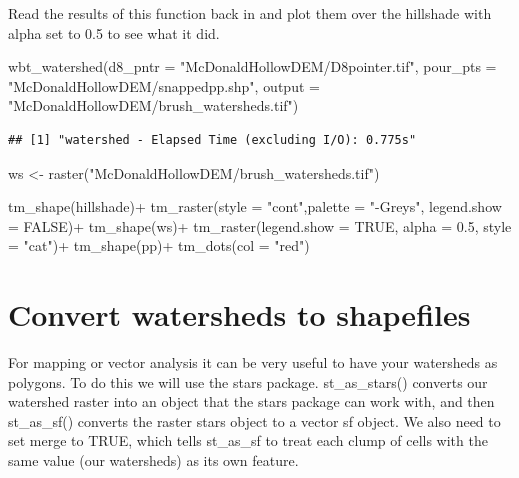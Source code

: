 \documentclass[
]{book}
\newenvironment{Shaded}{\begin{snugshade}}{\end{snugshade}}
\newcommand{\AttributeTok}[1]{\textcolor[rgb]{0.77,0.63,0.00}{#1}}
\newcommand{\ConstantTok}[1]{\textcolor[rgb]{0.00,0.00,0.00}{#1}}
\newcommand{\FloatTok}[1]{\textcolor[rgb]{0.00,0.00,0.81}{#1}}
\newcommand{\FunctionTok}[1]{\textcolor[rgb]{0.00,0.00,0.00}{#1}}
\newcommand{\NormalTok}[1]{#1}
\newcommand{\OtherTok}[1]{\textcolor[rgb]{0.56,0.35,0.01}{#1}}
\newcommand{\SpecialCharTok}[1]{\textcolor[rgb]{0.00,0.00,0.00}{#1}}
\newcommand{\StringTok}[1]{\textcolor[rgb]{0.31,0.60,0.02}{#1}}
\begin{document}
Read the results of this function back in and plot them over the hillshade with alpha set to 0.5 to see what it did.

\begin{Shaded}
\begin{Highlighting}[]
\FunctionTok{wbt\_watershed}\NormalTok{(}\AttributeTok{d8\_pntr =} \StringTok{"McDonaldHollowDEM/D8pointer.tif"}\NormalTok{,}
              \AttributeTok{pour\_pts =} \StringTok{"McDonaldHollowDEM/snappedpp.shp"}\NormalTok{,}
              \AttributeTok{output =} \StringTok{"McDonaldHollowDEM/brush\_watersheds.tif"}\NormalTok{)}
\end{Highlighting}
\end{Shaded}

\begin{verbatim}
## [1] "watershed - Elapsed Time (excluding I/O): 0.775s"
\end{verbatim}

\begin{Shaded}
\begin{Highlighting}[]
\NormalTok{ws }\OtherTok{\textless{}{-}} \FunctionTok{raster}\NormalTok{(}\StringTok{"McDonaldHollowDEM/brush\_watersheds.tif"}\NormalTok{)}

\FunctionTok{tm\_shape}\NormalTok{(hillshade)}\SpecialCharTok{+}
  \FunctionTok{tm\_raster}\NormalTok{(}\AttributeTok{style =} \StringTok{"cont"}\NormalTok{,}\AttributeTok{palette =} \StringTok{"{-}Greys"}\NormalTok{, }\AttributeTok{legend.show =} \ConstantTok{FALSE}\NormalTok{)}\SpecialCharTok{+}
\FunctionTok{tm\_shape}\NormalTok{(ws)}\SpecialCharTok{+}
  \FunctionTok{tm\_raster}\NormalTok{(}\AttributeTok{legend.show =} \ConstantTok{TRUE}\NormalTok{, }\AttributeTok{alpha =} \FloatTok{0.5}\NormalTok{, }\AttributeTok{style =} \StringTok{"cat"}\NormalTok{)}\SpecialCharTok{+}
\FunctionTok{tm\_shape}\NormalTok{(pp)}\SpecialCharTok{+}
  \FunctionTok{tm\_dots}\NormalTok{(}\AttributeTok{col =} \StringTok{"red"}\NormalTok{)}
\end{Highlighting}
\end{Shaded}

\hypertarget{convert-watersheds-to-shapefiles}{%
\section{Convert watersheds to shapefiles}\label{convert-watersheds-to-shapefiles}}

For mapping or vector analysis it can be very useful to have your watersheds as polygons. To do this we will use the stars package. st\_as\_stars() converts our watershed raster into an object that the stars package can work with, and then st\_as\_sf() converts the raster stars object to a vector sf object. We also need to set merge to TRUE, which tells st\_as\_sf to treat each clump of cells with the same value (our watersheds) as its own feature.
\end{document}
